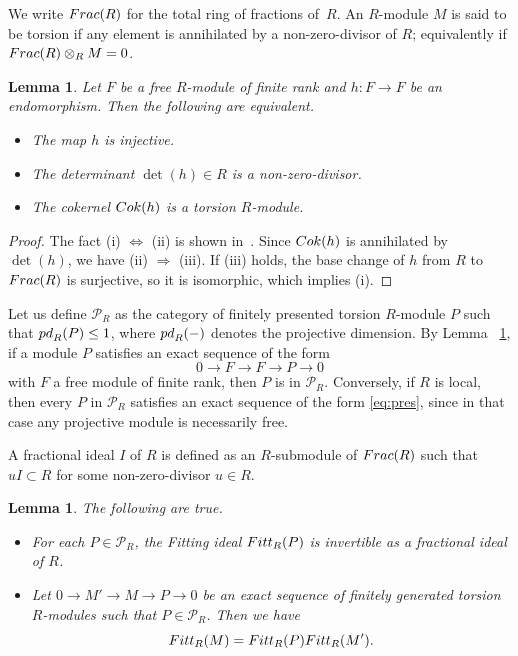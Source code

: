 \documentclass[11pt]{article}
\newtheorem{lemm}[theo]{Lemma}
\theoremstyle{definition}
\numberwithin{equation}{section}
\newcommand{\cP}{\mathcal{P}}
\newcommand{\Coker}{{\rm Cok}}
\newcommand{\Cok}{{\rm Cok}}
\newcommand{\Frac}{{\rm Frac}}
\newcommand{\Fitt}{{\rm Fitt}}
\newcommand{\pd}{{\rm pd}}
\begin{document}
We write $\Frac(R)$ for the total ring of fractions of~$R$.
An $R$-module $M$ is said to be torsion if any element is annihilated by a non-zero-divisor of $R$; equivalently if $\Frac(R) \otimes_R M = 0$.

\begin{lemm}\label{lem:tors_gen}
Let $F$ be a free $R$-module of finite rank and $h: F \to F$ be an endomorphism.
Then the following are equivalent.
\begin{itemize}
\item[(i)]
The map $h$ is injective.
\item[(ii)]
The determinant $\det(h) \in R$ is a non-zero-divisor.
\item[(iii)]
The cokernel $\Coker(h)$ is a torsion $R$-module.
\end{itemize}
\end{lemm}

\begin{proof}
The fact (i) $\Leftrightarrow$ (ii) is shown in~\cite[Chapter III, \S 8, Proposition 3, p.~524]{BouAlg74}.
Since $\Cok(h)$ is annihilated by $\det(h)$, we have (ii) $\Rightarrow$ (iii).
If (iii) holds, the base change of $h$ from $R$ to $\Frac(R)$ is surjective, so it is isomorphic, which implies (i).
\end{proof}

Let us define $\cP_R$ as the category of finitely presented torsion $R$-module $P$ such that $\pd_R(P) \leq 1$, where $\pd_R(-)$ denotes the projective dimension.
By Lemma ~\ref{lem:tors_gen}, if a module $P$ satisfies an exact sequence of the form
\begin{equation}\label{eq:pres}
0 \to F \to F \to P \to 0
\end{equation}
with $F$ a free module of finite rank, then $P$ is in $\cP_R$.
Conversely, if $R$ is local, then every $P$ in $\cP_R$ satisfies an exact sequence of the form \eqref{eq:pres}, since in that case any projective module is necessarily free.

A fractional ideal $I$ of $R$ is defined as an $R$-submodule of $\Frac(R)$ such that $u I \subset R$ for some non-zero-divisor $u \in R$.

\begin{lemm}\label{lem:FittP}
The following are true.
\begin{itemize}
\item[(1)]
For each $P \in \cP_R$, the Fitting ideal $\Fitt_R(P)$ is invertible as a fractional ideal of $R$.
\item[(2)]
Let $0 \to M' \to M \to P \to 0$ be an exact sequence of finitely generated torsion $R$-modules such that $P \in \cP_R$.
Then we have
\[
\Fitt_R(M) = \Fitt_R(P) \Fitt_R(M').
\]
\end{itemize}
\end{lemm}
\end{document}
